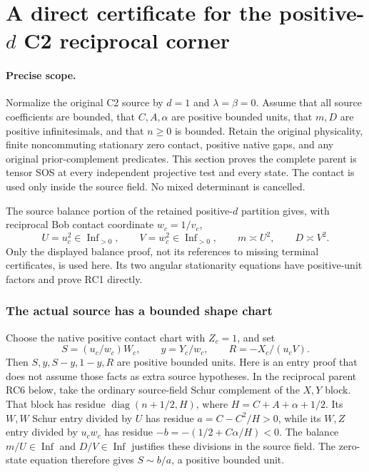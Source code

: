 \section{\texorpdfstring{A direct certificate for the positive-$d$ C2 reciprocal corner}{A direct certificate for the positive-d C2 reciprocal corner}}
\label{component:p10686597065a}

\label{p10686597065a:sec:new-rc-direct}

\paragraph{Precise scope.}
Normalize the original C2 source by $d=1$ and $\lambda=\beta=0$.
Assume that all source coefficients are bounded, that $C,A,\alpha$
are positive bounded units, that $m,D$ are positive infinitesimals,
and that $n\geq0$ is bounded. Retain the original physicality,
finite noncommuting stationary zero contact, positive native gaps,
and any original prior-complement predicates. This section proves
the complete parent is tensor SOS at every independent projective
test and every state. The contact is used only inside the source
field. No mixed determinant is cancelled.

The source balance portion of the retained positive-$d$ partition
gives, with reciprocal Bob contact coordinate $w_c=1/v_c$,
\[
 U=u_c^2\in\operatorname{Inf}_{>0},\qquad
 V=w_c^2\in\operatorname{Inf}_{>0},\qquad
 m\asymp U^2,\qquad D\asymp V^2.
 \tag{RC1}
\]
Only the displayed balance proof, not its references to missing
terminal certificates, is used here. Its two angular stationarity
equations have positive-unit factors and prove RC1 directly.

\subsubsection*{The actual source has a bounded shape chart}

Choose the native positive contact chart with $Z_c=1$, and set
\[
 S=(u_c/w_c)W_c,\qquad y=Y_c/w_c,\qquad
 R=-X_c/(u_cV).
 \tag{RC2}
\]
Then $S,y,S-y,1-y,R$ are positive bounded units. Here is an entry
proof that does not assume those facts as extra source hypotheses.
In the reciprocal parent RC6 below, take the ordinary source-field
Schur complement of the $X,Y$ block. That block has residue
$\operatorname{diag}(n+1/2,H)$, where $H=C+A+\alpha+1/2$.
Its $W,W$ Schur entry divided by $U$ has residue
$a=C-C^2/H>0$, while its $W,Z$ entry divided by $u_cw_c$
has residue $-b=-(1/2+C\alpha/H)<0$. The balance
$m/U\in\operatorname{Inf}$ and $D/V\in\operatorname{Inf}$
justifies these divisions in the source field. The zero-state
equation therefore gives $S\sim b/a$, a positive bounded unit.

